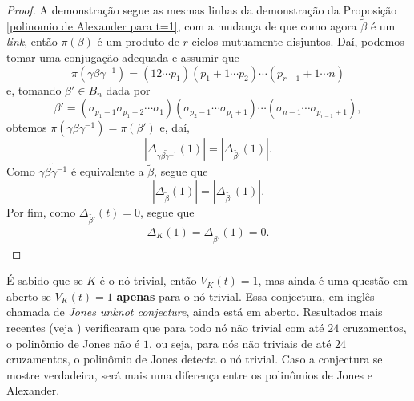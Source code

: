 	\begin{proof}
		A demonstração segue as mesmas linhas da demonstração da 
		Proposição \ref{polinomio de Alexander para t=1}, com a mudança de que 
		como agora $\widetilde{\beta}$ é um \textit{link}, então $\pi(\beta)$ 
		é um produto de $r$ ciclos mutuamente disjuntos. Daí, podemos tomar uma 
		conjugação adequada e assumir que
		\begin{equation*}
		    \pi(\gamma\beta\gamma^{-1}) = (12\cdots p_1)(p_1+1\cdots p_2)\cdots(p_{r-1}+1\cdots n)
		\end{equation*}
		e, tomando $\beta'\in B_n$ dada por
		\begin{equation*}
		    \beta' 
		    = (\sigma_{p_1-1}\sigma_{p_1-2}\cdots\sigma_1)(\sigma_{p_2-1}\cdots\sigma_{p_1+1})
		    \cdots( \sigma_{n-1}\cdots\sigma_{p_{r-1} + 1} ),
		\end{equation*}
		obtemos $\pi(\gamma\beta\gamma^{-1}) = \pi(\beta')$ e, daí,
		\begin{equation*}
		    |\Delta_{\widetilde{\gamma\beta\gamma^{-1}}}(1)| = | \Delta_{\widetilde{\beta'}}(1) |.
		\end{equation*}
		Como $\widetilde{\gamma\beta\gamma^{-1}}$ é equivalente a $\widetilde{\beta}$, segue que
		\begin{equation*}
		    |\Delta_{\widetilde{\beta}}(1)| = | \Delta_{\widetilde{\beta'}}(1) |.
		\end{equation*} 
		Por fim, como $\Delta_{\widetilde{\beta'}}(t) = 0$, segue que
		\begin{align*}
		    \Delta_K(1) = \Delta_{\widetilde{\beta'}}(1) = 0.
		\end{align*} 
	\end{proof}
	É sabido que se $K$ é o nó trivial, então $V_K(t) = 1$, mas ainda é uma questão em 
	aberto se $V_K(t) = 1$ \textbf{apenas} para o nó trivial. Essa conjectura, em inglês 
	chamada de \textit{Jones unknot conjecture}, ainda está em aberto. Resultados mais recentes 
	(veja \cite{Jones-detecta-no-trivial-1,Jones-detecta-no-trivial-2}) verificaram que para 
	todo nó não trivial com até $24$ cruzamentos, o polinômio de Jones não é $1$, ou seja, para 
	nós não triviais de até $24$ cruzamentos, o polinômio de Jones detecta o nó trivial. 
	Caso a conjectura se mostre verdadeira, será mais uma diferença entre os polinômios de Jones e Alexander.
	
